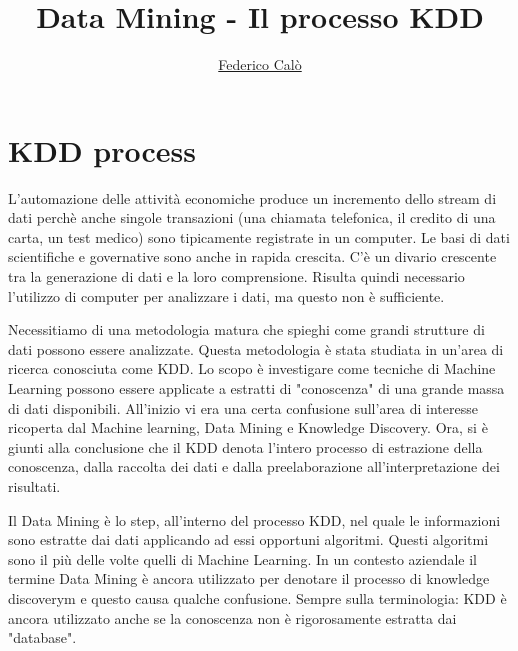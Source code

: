 \documentclass[a4paper]{extarticle}
\title{Data Mining - Il processo KDD}
\author{\href{http://www.federicocalo.it}{Federico Calò} }
\date{}
\begin{document}
\maketitle
\newpage
\tableofcontents
\voffset -30pt

\newpage

\section{KDD process}

L'automazione delle attività economiche produce un incremento dello stream di dati perchè anche singole transazioni (una chiamata telefonica, il credito di una carta, un test medico) sono tipicamente registrate in un computer.
Le basi di dati scientifiche e governative sono anche in rapida crescita. C'è un divario crescente tra la generazione di dati e la loro comprensione. Risulta quindi necessario l'utilizzo di computer per analizzare i dati, ma questo non è sufficiente.

Necessitiamo di una metodologia matura che spieghi come grandi strutture di dati possono essere analizzate. Questa metodologia è stata studiata in un'area di ricerca conosciuta come KDD. Lo scopo è investigare come tecniche di Machine Learning possono 
essere applicate a estratti di "conoscenza" di una grande massa di dati disponibili. All'inizio vi era una certa confusione sull'area di interesse ricoperta dal Machine learning, Data Mining e Knowledge Discovery. 
Ora, si è giunti alla conclusione che il KDD denota l'intero processo di estrazione della conoscenza, dalla raccolta dei dati e dalla preelaborazione all'interpretazione dei risultati.

Il Data Mining è lo step, all'interno del processo KDD, nel quale le informazioni sono estratte dai dati applicando ad essi opportuni algoritmi. Questi algoritmi sono il più delle volte quelli di Machine Learning. 
In un contesto aziendale il termine Data Mining è ancora utilizzato per denotare il processo di knowledge discoverym e questo causa qualche confusione. Sempre sulla terminologia: KDD è ancora utilizzato anche se la conoscenza non è rigorosamente estratta dai "database". 
\end{document}
